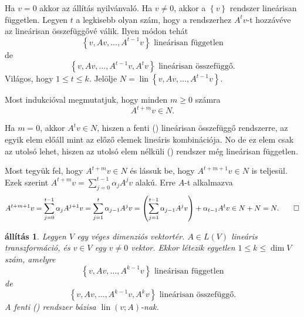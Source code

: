\documentclass[9pt, a4paper, showtrims]{memoir}
\makeatletter
\renewenvironment{proof}[1][\proofname]
    {\par\pushQED{\qed}%
    \normalfont \topsep6\p@\@plus6\p@\relax
    \trivlist
    \item[\hskip\labelsep
        \itshape
    #1\@addpunct{:}]\ignorespaces}
    {\popQED\endtrivlist\@endpefalse}
\theoremstyle{plain}
\newtheorem{proposition}{állítás}[chapter]
\theoremstyle{remark}
\theoremstyle{definition}
\DeclareMathOperator{\lin}{lin}
\makeatother
\begin{document}
    \begin{proof}
        Ha $v=0$ akkor az állítás nyilvánvaló.
        Ha $v\neq 0$, akkor a $\left\{ v \right\}$ rendszer lineárisan független.
        Legyen $t$ a legkisebb olyan szám, hogy a rendszerhez $A^tv$-t hozzávéve az lineárisan összefüggővé válik.
        Ilyen módon tehát
        \[
            \left\{ v,Av,\dots,A^{t-1}v \right\} \text{ lineárisan független}\tag{\dag}
        \]
        de
        \[
            \left\{ v,Av,\dots,A^{t-1}v, A^tv \right\} \text{ lineárisan összefüggő.}\tag{\ddag}
        \]
        Világos, hogy $1\leq t\leq k$.
        Jelölje $N=\lin\left\{ v, Av,\dots,A^{t-1}v \right\}$.

        Most indukcióval megmutatjuk, hogy minden $m\geq 0$ számra
        \[
            A^{t+m}v\in N.
        \]

        Ha $m=0$, akkor $A^tv\in N$, hiszen a fenti (\ddag) lineárisan összefüggő rendszerre,
        az egyik elem előáll mint az előző elemek lineáris kombinációja.
        No de ez elem csak az utolsó lehet, 
        hiszen az utolsó elem nélküli (\dag) rendszer még lineárisan független.

        Most tegyük fel, hogy $A^{t+m}v\in N$ és lássuk be, hogy $A^{t+m+1}v\in N$ is teljesül.
        Ezek szerint
        \begin{math}
            A^{t+m}v=\sum_{j=0}^{t-1}\alpha_jA^jv
        \end{math}
        alakú. Erre $A$-t alkalmazva
        \begin{displaymath}
            A^{t+m+1}v
            =
            \sum_{j=0}^{t-1}\alpha_jA^{j+1}v
            =
            \sum_{j=1}^{t}\alpha_{j-1}A^{j}v
            =
            \left( \sum_{j=1}^{t-1}\alpha_{ j-1}A^{j}v \right)+\alpha_{t-1}A^tv\in N+N=N.\qedhere
        \end{displaymath}
    \end{proof}
    \begin{proposition}
        Legyen $V$ egy véges dimenziós vektortér.
        $A\in L\left( V \right)$ lineáris transzformáció,
        és $v\in V$ egy $v\neq 0$ vektor.
        Ekkor létezik egyetlen $1\leq k\leq \dim V$ szám,
        amelyre 
        \[
            \left\{ v,Av,\dots,A^{k-1}v \right\} \text{ lineárisan független}\tag{\dag}
        \]
        de
        \[
            \left\{ v,Av,\dots,A^{k-1}v, A^kv \right\} \text{ lineárisan összefüggő.}\tag{\ddag}
        \]
        A fenti (\dag) rendszer bázisa $\lin\left( v;A \right)$-nak.
    \end{proposition}
\end{document}
